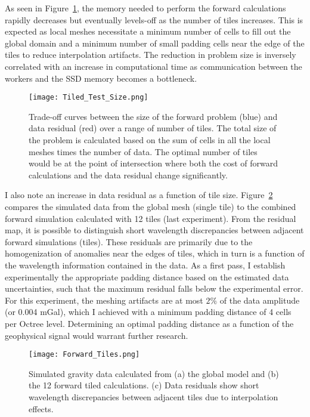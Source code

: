 As seen in Figure~\ref{Tiled_Test_Size}, the memory needed to perform the forward calculations rapidly decreases but eventually levels-off as the number of tiles increases. This is expected as local meshes necessitate a minimum number of cells to fill out the global domain and a minimum number of small padding cells near the edge of the tiles to reduce interpolation artifacts. The reduction in problem size is inversely correlated with an increase in computational time as communication between the workers and the SSD memory becomes a bottleneck.
\begin{figure}[h!]
{\centering
\texttt{[image: Tiled\_Test\_Size.png]}}
\caption{Trade-off curves between the size of the forward problem (blue) and data residual (red) over a range of number of tiles. The total size of the problem is calculated based on the sum of cells in all the local meshes times the number of data. The optimal number of tiles would be at the point of intersection where both the cost of forward calculations and the data residual change significantly.}
\label{Tiled_Test_Size}
\end{figure}

I also note an increase in data residual as a function of tile size.
Figure~\ref{Tiled_Residual} compares the simulated data from the global mesh (single tile) to the combined forward simulation calculated with 12 tiles (last experiment). From the residual map, it is possible to distinguish short wavelength discrepancies between adjacent forward simulations (tiles). These residuals are primarily due to the homogenization of anomalies near the edges of tiles, which in turn is a function of the wavelength information contained in the data. As a first pass, I establish experimentally the appropriate padding distance based on the estimated data uncertainties, such that the maximum residual falls below the experimental error. For this experiment, the meshing artifacts are at most $2\%$ of the data amplitude (or 0.004 mGal), which I achieved with a minimum padding distance of 4 cells per Octree level. Determining an optimal padding distance as a function of the geophysical signal would warrant further research. 
\begin{figure}[h!]
{\centering
\texttt{[image: Forward\_Tiles.png]}}
\caption{Simulated gravity data calculated from (a) the global model and (b) the 12 forward tiled calculations. (c) Data residuals show short wavelength discrepancies between adjacent tiles due to interpolation effects.}
\label{Tiled_Residual}
\end{figure}


\endinput

